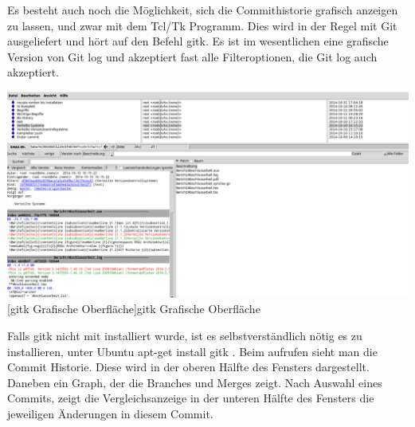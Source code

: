 \documentclass[12pt,a4paper,bibliography=totocnumbered,listof=totocnumbered]{scrartcl}
\begin{document}
Es besteht auch noch die Möglichkeit, sich die Commithistorie grafisch anzeigen zu lassen, und zwar mit dem Tcl/Tk Programm.
Dies wird in der Regel mit Git ausgeliefert und hört auf den Befehl gitk. Es ist im wesentlichen eine grafische Version von Git log und akzeptiert fast alle Filteroptionen, die Git log auch akzeptiert.

\vspace{3pt}
\begin{minipage}{\linewidth}
	\centering
	\includegraphics[width=0.9\linewidth]{Bilder/gitk.png}
	[gitk Grafische Oberfläche]{gitk Grafische Oberfläche}
	\label{fig:osgi}
\end{minipage}

Falls gitk nicht mit installiert wurde, ist es selbstverständlich nötig es zu installieren, unter Ubuntu apt-get install gitk .
Beim aufrufen sieht man die Commit Historie. Diese wird in der oberen Hälfte des Fensters dargestellt. Daneben ein Graph, der die Branches und Merges zeigt. Nach Auswahl eines Commits, zeigt die Vergleichsanzeige in der unteren Hälfte des Fensters die jeweiligen Änderungen in diesem Commit.
\newpage




\end{document}
